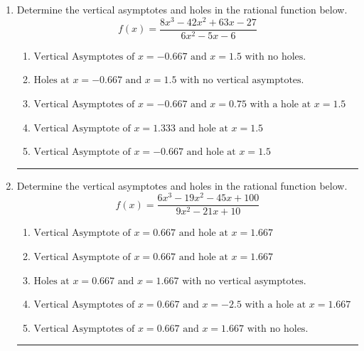 \documentclass[14pt]{extbook}
\newcommand{\litem}[1]{\item#1\hspace*{-1cm}\rule{\textwidth}{0.4pt}}
\begin{document}
\begin{enumerate}
{\begin{enumerate}[label=\Alph*.]
\end{enumerate} }
\litem{
Determine the vertical asymptotes and holes in the rational function below.\[ f(x) = \frac{8x^{3} -42 x^{2} +63 x -27}{6x^{2} -5 x -6} \]\begin{enumerate}[label=\Alph*.]
\item \( \text{Vertical Asymptotes of } x = -0.667 \text{ and } x = 1.5 \text{ with no holes.} \)
\item \( \text{Holes at } x = -0.667 \text{ and } x = 1.5 \text{ with no vertical asymptotes.} \)
\item \( \text{Vertical Asymptotes of } x = -0.667 \text{ and } x = 0.75 \text{ with a hole at } x = 1.5 \)
\item \( \text{Vertical Asymptote of } x = 1.333 \text{ and hole at } x = 1.5 \)
\item \( \text{Vertical Asymptote of } x = -0.667 \text{ and hole at } x = 1.5 \)

\end{enumerate} }
\litem{
Determine the vertical asymptotes and holes in the rational function below.\[ f(x) = \frac{6x^{3} -19 x^{2} -45 x + 100}{9x^{2} -21 x + 10} \]\begin{enumerate}[label=\Alph*.]
\item \( \text{Vertical Asymptote of } x = 0.667 \text{ and hole at } x = 1.667 \)
\item \( \text{Vertical Asymptote of } x = 0.667 \text{ and hole at } x = 1.667 \)
\item \( \text{Holes at } x = 0.667 \text{ and } x = 1.667 \text{ with no vertical asymptotes.} \)
\item \( \text{Vertical Asymptotes of } x = 0.667 \text{ and } x = -2.5 \text{ with a hole at } x = 1.667 \)
\item \( \text{Vertical Asymptotes of } x = 0.667 \text{ and } x = 1.667 \text{ with no holes.} \)

\end{enumerate} }
\end{enumerate}
\end{document}

